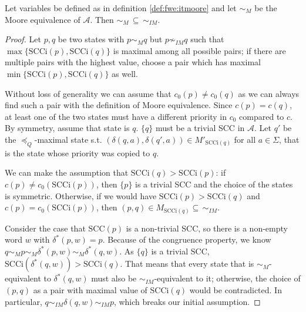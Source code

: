 \newpage

\begin{theorem}
	Let variables be defined as in definition \ref{def:fwe:itmoore} and let $\sim_M$ be the Moore equivalence of $\mathcal{A}$. Then $\sim_M \,\subseteq\, \sim_{IM}$.
\end{theorem}

\begin{proof}
	Let $p, q$ be two states with $p \sim_M q$ but $p \not\sim_{IM} q$ such that $\max \{\text{SCCi}(p), \text{SCCi}(q)\}$ is maximal among all possible pairs; if there are multiple pairs with the highest value, choose a pair which has maximal $\min \{\text{SCCi}(p), \text{SCCi}(q)\}$ as well.
	
	Without loss of generality we can assume that $c_0(p) \neq c_0(q)$ as we can always find such a pair with the definition of Moore equivalence. Since $c(p) = c(q)$, at least one of the two states must have a different priority in $c_0$ compared to $c$. By symmetry, assume that state is $q$. $\{q\}$ must be a trivial SCC in $\mathcal{A}$. Let $q'$ be the $\preceq_Q$-maximal state s.t. $(\delta(q, a), \delta(q', a)) \in M'_{\text{SCCi}(q)}$ for all $a \in \Sigma$, that is the state whose priority was copied to $q$.
	
	We can make the assumption that $\text{SCCi}(q) > \text{SCCi}(p)$: if $c(p) \neq c_0(\text{SCCi}(p))$, then $\{p\}$ is a trivial SCC and the choice of the states is symmetric. Otherwise, if we would have $\text{SCCi}(p) > \text{SCCi}(q)$ and $c(p) = c_0(\text{SCCi}(p))$, then $(p, q) \in M_{\text{SCCi}(q)} \subseteq\, \sim_{IM}$. 
	
	Consider the case that $\text{SCC}(p)$ is a non-trivial SCC, so there is a non-empty word $w$ with $\delta^*(p, w) = p$. Because of the congruence property, we know $q \sim_M p \sim_M \delta^*(p, w) \sim_M \delta^*(q, w)$. As $\{q\}$ is a trivial SCC, $\text{SCCi}(\delta^*(q, w)) > \text{SCCi}(q)$. That means that every state that is $\sim_M$-equivalent to $\delta^*(q, w)$ must also be $\sim_{IM}$-equivalent to it; otherwise, the choice of $(p, q)$ as a pair with maximal value of $\text{SCCi}(q)$ would be contradicted. In particular, $q \sim_{IM} \delta(q, w) \sim_{IM} p$, which breaks our initial assumption.
	\vspace{5pt}
	

\end{proof}
